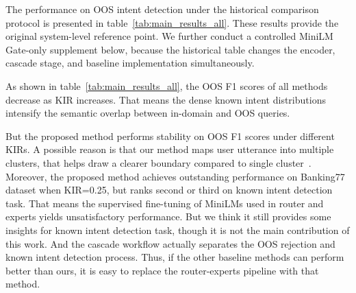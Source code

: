 \documentclass[11pt]{article}
\begin{document}
The performance on OOS intent detection under the historical comparison protocol is presented in table~\ref{tab:main_results_all}. These results provide the original system-level reference point. We further conduct a controlled MiniLM Gate-only supplement below, because the historical table changes the encoder, cascade stage, and baseline implementation simultaneously.

As shown in table~\ref{tab:main_results_all}, the OOS F1 scores of all methods decrease as KIR increases. That means the dense known intent distributions intensify the semantic overlap between in-domain and OOS queries.


But the proposed method performs stability on OOS F1 scores under different KIRs. A possible reason is that our method maps user utterance into multiple clusters, that helps draw a clearer boundary compared to single cluster~\citep{zhang2021adaptive, zhang2023learning}. Moreover, the proposed method achieves outstanding performance on Banking77 dataset when KIR=0.25, but ranks second or third on known intent detection task. That means the supervised fine-tuning of MiniLMs used in router and experts yields unsatisfactory performance. But we think it still provides some insights for known intent detection task, though it is not the main contribution of this work. And the cascade workflow actually separates the OOS rejection and known intent detection process. Thus, if the other baseline methods can perform better than ours, it is easy to replace the router-experts pipeline with that method.  
\end{document}
